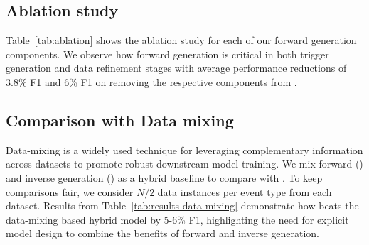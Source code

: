 \subsection{Ablation study}
\label{sec:analysis-ablation}

Table~\ref{tab:ablation} shows the ablation study for each of our forward generation components.
We observe how forward generation is critical in both trigger generation and data refinement stages with average performance reductions of 3.8\% F1 and 6\% F1 on removing the respective components from \modelName.


\subsection{Comparison with Data mixing}
Data-mixing \cite{DBLP:conf/nips/HoffmannBMBCRCH22, DBLP:conf/nips/XieS0L23} is a widely used technique for leveraging complementary information across datasets to promote robust downstream model training.
We mix forward (\extracttrain) and inverse generation (\starName) as a hybrid baseline to compare with \modelName.
To keep comparisons fair, we consider $N/2$ data instances per event type from each dataset.
Results from Table~\ref{tab:results-data-mixing} demonstrate how \modelName{} beats the data-mixing based hybrid model by 5-6\% F1, highlighting the need for explicit model design to combine the benefits of forward and inverse generation.

